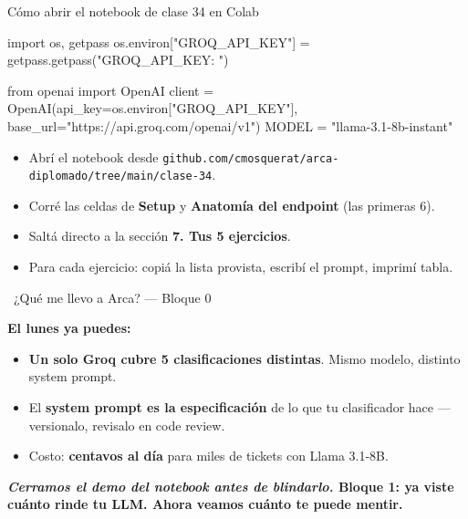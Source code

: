 \documentclass[aspectratio=169, 11pt]{beamer}
\begin{document}
\begin{frame}{Cómo abrir el notebook de clase 34 en Colab}
  \begin{pyblock}
import os, getpass
os.environ["GROQ_API_KEY"] = getpass.getpass("GROQ_API_KEY: ")

from openai import OpenAI
client = OpenAI(api_key=os.environ["GROQ_API_KEY"],
                base_url="https://api.groq.com/openai/v1")
MODEL = "llama-3.1-8b-instant"
  \end{pyblock}
  \vspace{6pt}
  \begin{itemize}\setlength{\itemsep}{3pt}
    \footnotesize
    \item Abrí el notebook desde \texttt{github.com/cmosquerat/arca-diplomado/tree/main/clase-34}.
    \item Corré las celdas de \textbf{Setup} y \textbf{Anatomía del endpoint} (las primeras 6).
    \item Saltá directo a la sección \textbf{7. Tus 5 ejercicios}.
    \item Para cada ejercicio: copiá la lista provista, escribí el prompt, imprimí tabla.
  \end{itemize}
\end{frame}

\begin{frame}[shrink]{\faIndustry\ ¿Qué me llevo a Arca? --- Bloque 0}
  \vspace{4pt}
  {\footnotesize\color{arcaDark}\bfseries El lunes ya puedes:\par}
  \vspace{4pt}
  \begin{itemize}\setlength{\itemsep}{4pt}
    \footnotesize
    \item \textbf{Un solo Groq cubre 5 clasificaciones distintas}. Mismo modelo, distinto system prompt.
    \item El \textbf{system prompt es la especificación} de lo que tu clasificador hace ---
    versionalo, revisalo en code review.
    \item Costo: \textbf{centavos al día} para miles de tickets con Llama 3.1-8B.
  \end{itemize}
  \vspace{8pt}
  \begin{tcolorbox}[colback=arcaRed!8, colframe=arcaRed, leftrule=3pt,
    boxrule=0pt, sharp corners, left=8pt, right=8pt, top=4pt, bottom=4pt]
    {\footnotesize\color{arcaDark}\bfseries
    \emph{Cerramos el demo del notebook antes de blindarlo.}
    \faArrowRight\;Bloque 1: ya viste cuánto rinde tu LLM. Ahora veamos cuánto te puede mentir.}
  \end{tcolorbox}
\end{frame}
\end{document}
